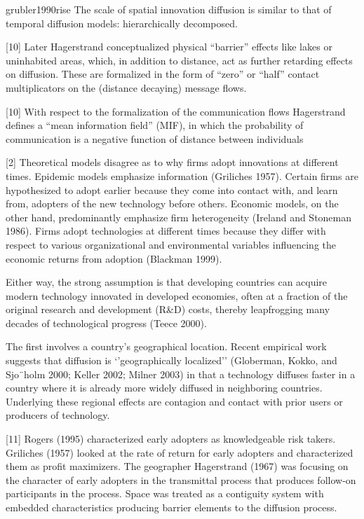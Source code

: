 \documentclass[10pt,letterpaper]{article}
\begin{document}
grubler1990rise The scale of spatial innovation diffusion is similar to
that of temporal diffusion models: hierarchically decomposed.

{[}10{]} Later Hagerstrand conceptualized physical ``barrier'' effects
like lakes or uninhabited areas, which, in addition to distance, act as
further retarding effects on diffusion. These are formalized in the form
of ``zero'' or ``half'' contact multiplicators on the (distance
decaying) message flows.

{[}10{]} With respect to the formalization of the communication flows
Hagerstrand defines a ``mean information field'' (MIF), in which the
probability of communication is a negative function of distance between
individuals

{[}2{]} Theoretical models disagree as to why firms adopt innovations at
different times. Epidemic models emphasize information (Griliches 1957).
Certain firms are hypothesized to adopt earlier because they come into
contact with, and learn from, adopters of the new technology before
others. Economic models, on the other hand, predominantly emphasize firm
heterogeneity (Ireland and Stoneman 1986). Firms adopt technologies at
different times because they differ with respect to various
organizational and environmental variables influencing the economic
returns from adoption (Blackman 1999).

Either way, the strong assumption is that developing countries can
acquire modern technology innovated in developed economies, often at a
fraction of the original research and development (R\&D) costs, thereby
leapfrogging many decades of technological progress (Teece 2000).

The first involves a country's geographical location. Recent empirical
work suggests that diffusion is `'geographically localized'' (Globerman,
Kokko, and Sjo¨holm 2000; Keller 2002; Milner 2003) in that a technology
diffuses faster in a country where it is already more widely diffused in
neighboring countries. Underlying these regional effects are contagion
and contact with prior users or producers of technology.

{[}11{]} Rogers (1995) characterized early adopters as knowledgeable
risk takers. Griliches (1957) looked at the rate of return for early
adopters and characterized them as profit maximizers. The geographer
Hagerstrand (1967) was focusing on the character of early adopters in
the transmittal process that produces follow-on participants in the
process. Space was treated as a contiguity system with embedded
characteristics producing barrier elements to the diffusion process.
\end{document}
